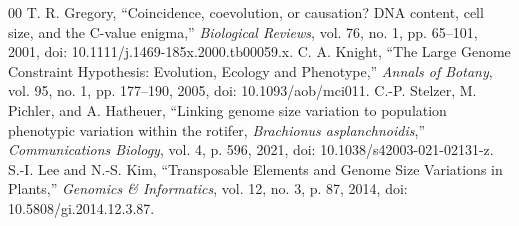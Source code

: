 \documentclass[conference]{IEEEtran}
\begin{document}
\begin{thebibliography}{00}
 T. R. Gregory, ``Coincidence, coevolution, or causation? DNA content, cell size, and the C-value enigma,'' \emph{Biological Reviews}, vol. 76, no. 1, pp. 65--101, 2001, doi: 10.1111/j.1469-185x.2000.tb00059.x.
 C. A. Knight, ``The Large Genome Constraint Hypothesis: Evolution, Ecology and Phenotype,'' \emph{Annals of Botany}, vol. 95, no. 1, pp. 177--190, 2005, doi: 10.1093/aob/mci011.
 C.-P. Stelzer, M. Pichler, and A. Hatheuer, ``Linking genome size variation to population phenotypic variation within the rotifer, \emph{Brachionus asplanchnoidis},'' \emph{Communications Biology}, vol. 4, p. 596, 2021, doi: 10.1038/s42003-021-02131-z.
 S.-I. Lee and N.-S. Kim, ``Transposable Elements and Genome Size Variations in Plants,'' \emph{Genomics \& Informatics}, vol. 12, no. 3, p. 87, 2014, doi: 10.5808/gi.2014.12.3.87.
\end{thebibliography}
\end{document}
